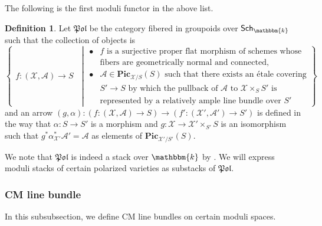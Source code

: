 \documentclass[12pt,twoside]{amsart}
\theoremstyle{definition}
\newtheorem{defn}[thm]{Definition}
\begin{document}
The following is the first moduli functor in the above list.
\begin{defn}\label{defn--pol}
Let $\mathfrak{Pol}$ be the category fibered in groupoids over $\mathsf{Sch}_{\mathbbm{k}}$ such that the collection of objects is
\[
\left\{
\begin{array}{l}
f\colon(\mathcal{X},\mathscr{A})\to S
\end{array}
\;\middle|
\begin{array}{rl}
\bullet\!\!&\text{$f$ is a surjective proper flat morphism of schemes whose}\\
&\text{fibers are geometrically normal and connected,}\\
\bullet\!\!&\text{$\mathscr{A}\in \mathbf{Pic}_{\mathcal{X}/S}(S)$ such that there exists an \'{e}tale covering}\\
&\text{$S'\to S$ by which the pullback of $\mathscr{A}$ to $\mathcal{X}\times_SS'$ is}\\
&\text{represented by a relatively ample line bundle over $S'$}
\end{array}\right\},
\]
and an arrow $(g,\alpha)\colon(f\colon(\mathcal{X},\mathscr{A})\to S)\to (f'\colon(\mathcal{X}',\mathscr{A}')\to S')$ is defined in the way that $\alpha\colon S\to S'$ is a morphism and $g\colon\mathcal{X}\to \mathcal{X}'\times_{S'}S$ is an isomorphism such that $g^*\alpha_{\mathcal{X}'}^*\mathscr{A}'=\mathscr{A}$ as elements of $\mathbf{Pic}_{\mathcal{X}'/S'}(S)$. 
\end{defn}

We note that $\mathfrak{Pol}$ is indeed a stack over $\mathbbm{k}$ by \cite[Lemma 2.15]{HH}.
We will express moduli stacks of certain polarized varieties as substacks of $\mathfrak{Pol}$.



\subsubsection{CM line bundle}

In this subsubsection, we define CM line bundles on certain moduli spaces. 
\end{document}
